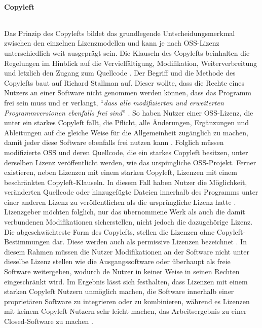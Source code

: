 \paragraph{Copyleft} $~$

Das Prinzip des Copylefts bildet das grundlegende Untscheidungsmerkmal zwischen den einzelnen Lizenzmodellen und kann je nach OSS-Lizenz unterschiedlich weit ausgeprägt sein. Die Klauseln des Copylefts beinhalten die Regelungen im Hinblick auf die Vervielfältigung, Modifikation, Weiterverbreitung und letzlich den Zugang zum Quellcode \cite{fsf_copyleft_2021}. Der Begriff und die Methode des Copylefts baut auf Richard Stallman auf. Dieser wollte, dass die Rechte eines Nutzers an einer Software nicht genommen werden können, dass das Programm frei sein muss und er verlangt, "`\textit{dass alle modifizierten und erweiterten Programmversionen ebenfalls frei sind}"' \cite{fsf_copyleft_2021}. So haben Nutzer einer OSS-Lizenz, die unter ein starkes Copyleft fällt, die Pflicht, alle Änderungen, Ergänzungen und Ableitungen auf die gleiche Weise für die Allgemeinheit zugänglich zu machen, damit jeder diese Software ebenfalls frei nutzen kann \cite{gerlach_praxisprobleme_2006}. Folglich müssen modifizierte OSS und deren Quellcode, die ein starkes Copyleft besitzen, unter derselben Lizenz veröffentlicht werden, wie das urspüngliche OSS-Projekt. Ferner existieren, neben Lizenzen mit einem starken Copyleft, Lizenzen mit einem beschränkten Copyleft-Klauseln. In diesem Fall haben Nutzer die Möglichkeit, veränderten Quellcode oder hinzugefügte Dateien innerhalb des Programms unter einer anderen Lizenz zu veröffentlichen als die ursprüngliche Lizenz hatte \cite[S. 11/12]{bitkom_open_nodate}. Lizenzgeber möchten folglich, nur das übernommene Werk als auch die damit verbundenen Modifikationen sicherstellen, nicht jedoch die dazugehörige Lizenz. Die abgeschwächteste Form des Copylefts, stellen die Lizenzen ohne Copyleft-Bestimmungen dar. Diese werden auch als permissive Lizenzen bezeichnet \cite[S. 17]{bitkom_open_2016}. In diesem Rahmen müssen die Nutzer Modifikationen an der Software nicht unter dieselbe Lizenz stellen wie die Ausgangssoftware oder überhaupt als freie Software weitergeben, wodurch de Nutzer in keiner Weise in seinen Rechten eingeschränkt wird. Im Ergebnis lässt sich festhalten, dass Lizenzen mit einem starken Copyleft Nutzern unmöglich machen, die Software innerhalb einer proprietären Software zu integrieren oder zu kombinieren, während es Lizenzen mit keinem Copyleft Nutzern sehr leicht machen, das Arbeitsergebnis zu einer Closed-Software zu machen \cite[S. 17]{bitkom_open_2016}.

